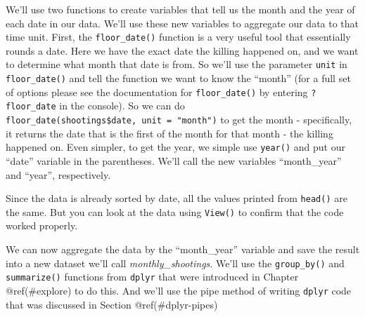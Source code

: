 \documentclass[
]{krantz}
\makeatletter
\newenvironment{Shaded}{\begin{snugshade}}{\end{snugshade}}
\newcommand{\AttributeTok}[1]{\textcolor[rgb]{0.61,0.61,0.61}{#1}}
\newcommand{\CommentTok}[1]{\textcolor[rgb]{0.37,0.37,0.37}{\textit{#1}}}
\newcommand{\FunctionTok}[1]{\textcolor[rgb]{0,0,0}{#1}}
\newcommand{\NormalTok}[1]{#1}
\newcommand{\OtherTok}[1]{\textcolor[rgb]{0.37,0.37,0.37}{#1}}
\newcommand{\SpecialCharTok}[1]{\textcolor[rgb]{0,0,0}{#1}}
\newcommand{\StringTok}[1]{\textcolor[rgb]{0.5,0.5,0.5}{#1}}
\newenvironment{kframe}{%
\medskip{}
\setlength{\fboxsep}{.8em}
 \def\at@end@of@kframe{}%
 \ifinner\ifhmode%
  \def\at@end@of@kframe{\end{minipage}}%
  \begin{minipage}{\columnwidth}%
 \fi\fi%
 \def\FrameCommand##1{\hskip\@totalleftmargin \hskip-\fboxsep
 \colorbox{shadecolor}{##1}\hskip-\fboxsep
     \hskip-\linewidth \hskip-\@totalleftmargin \hskip\columnwidth}%
 \MakeFramed {\advance\hsize-\width
   \@totalleftmargin\z@ \linewidth\hsize
   \@setminipage}}%
 {\par\unskip\endMakeFramed%
 \at@end@of@kframe}
\renewenvironment{Shaded}{\begin{kframe}}{\end{kframe}}
\makeatother
\begin{document}
We'll use two functions to create variables that tell us the month and the year of each date in our data. We'll use these new variables to aggregate our data to that time unit. First, the \texttt{floor\_date()} function is a very useful tool that essentially rounds a date. Here we have the exact date the killing happened on, and we want to determine what month that date is from. So we'll use the parameter \texttt{unit} in \texttt{floor\_date()} and tell the function we want to know the ``month'' (for a full set of options please see the documentation for \texttt{floor\_date()} by entering \texttt{?floor\_date} in the console). So we can do \texttt{floor\_date(shootings\$date,\ unit\ =\ "month")} to get the month - specifically, it returns the date that is the first of the month for that month - the killing happened on. Even simpler, to get the year, we simple use \texttt{year()} and put our ``date'' variable in the parentheses. We'll call the new variables ``month\_year'' and ``year'', respectively.

\begin{Shaded}
\end{Shaded}

Since the data is already sorted by date, all the values printed from \texttt{head()} are the same. But you can look at the data using \texttt{View()} to confirm that the code worked properly.

We can now aggregate the data by the ``month\_year'' variable and save the result into a new dataset we'll call \emph{monthly\_shootings}. We'll use the \texttt{group\_by()} and \texttt{summarize()} functions from \texttt{dplyr} that were introduced in Chapter @ref(\#explore) to do this. And we'll use the pipe method of writing \texttt{dplyr} code that was discussed in Section @ref(\#dplyr-pipes)
\end{document}
